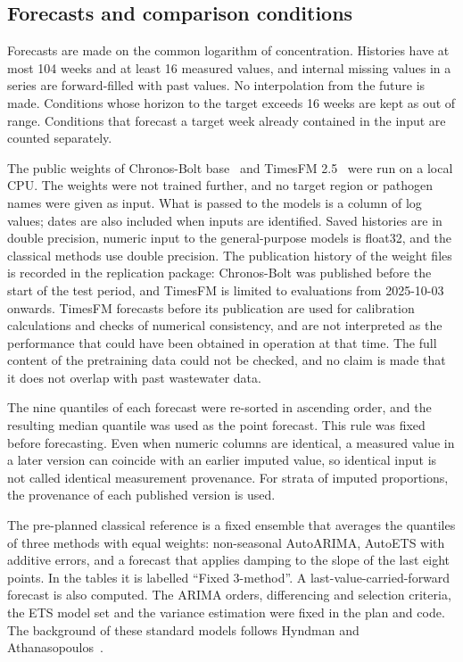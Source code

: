 \documentclass[11pt]{article}
\begin{document}
\subsection{Forecasts and comparison conditions}

Forecasts are made on the common logarithm of concentration. Histories have at most 104 weeks and at least 16 measured values, and internal missing values in a series are forward-filled with past values. No interpolation from the future is made. Conditions whose horizon to the target exceeds 16 weeks are kept as out of range. Conditions that forecast a target week already contained in the input are counted separately.

The public weights of Chronos-Bolt base~\cite{chronosbolt} and TimesFM 2.5~\cite{timesfm25} were run on a local CPU. The weights were not trained further, and no target region or pathogen names were given as input. What is passed to the models is a column of log values; dates are also included when inputs are identified. Saved histories are in double precision, numeric input to the general-purpose models is float32, and the classical methods use double precision. The publication history of the weight files is recorded in the replication package: Chronos-Bolt was published before the start of the test period, and TimesFM is limited to evaluations from 2025-10-03 onwards. TimesFM forecasts before its publication are used for calibration calculations and checks of numerical consistency, and are not interpreted as the performance that could have been obtained in operation at that time. The full content of the pretraining data could not be checked, and no claim is made that it does not overlap with past wastewater data.

The nine quantiles of each forecast were re-sorted in ascending order, and the resulting median quantile was used as the point forecast. This rule was fixed before forecasting. Even when numeric columns are identical, a measured value in a later version can coincide with an earlier imputed value, so identical input is not called identical measurement provenance. For strata of imputed proportions, the provenance of each published version is used.

The pre-planned classical reference is a fixed ensemble that averages the quantiles of three methods with equal weights: non-seasonal AutoARIMA, AutoETS with additive errors, and a forecast that applies damping to the slope of the last eight points. In the tables it is labelled ``Fixed 3-method''. A last-value-carried-forward forecast is also computed. The ARIMA orders, differencing and selection criteria, the ETS model set and the variance estimation were fixed in the plan and code. The background of these standard models follows Hyndman and Athanasopoulos~\cite{fpp3}.
\end{document}
